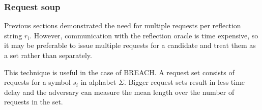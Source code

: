 \subsubsection{Request soup}
Previous sections demonstrated the need for multiple requests per reflection
string $r_i$. However, communication with the reflection oracle is time
expensive, so it may be preferable to issue multiple requests for a candidate
and treat them as a set rather than separately.

This technique is useful in the case of BREACH. A request set consists of
requests for a symbol $s_i$ in alphabet $\Sigma$. Bigger request sets result in
less time delay and the adversary can measure the mean length over the number of
requests in the set.
